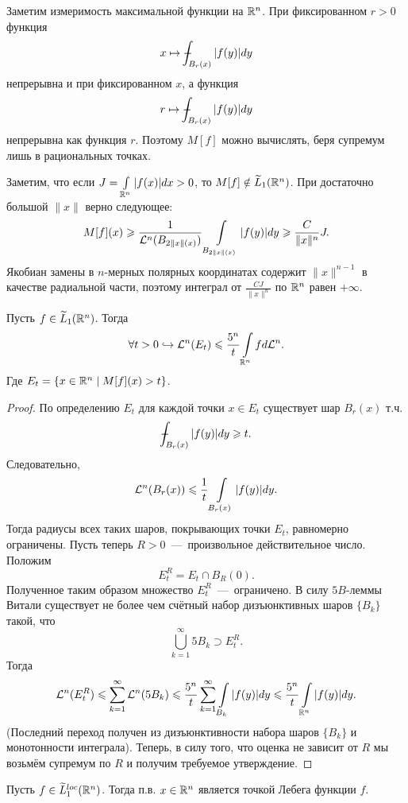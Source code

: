 \begin{note}
    Заметим измеримость максимальной функции на $\mathbb{R}^n$. При фиксированном $r > 0$ функция \[x \mapsto \dashint_{B_r(x)}|f(y)|dy\]
    непрерывна и при фиксированном $x$, а функция \[r \mapsto \dashint_{B_r(x)}|f(y)|dy\] непрерывна как функция $r$.
    Поэтому $M[f]$ можно вычислять, беря супремум лишь в рациональных точках.
\end{note}
\begin{note}
    Заметим, что если $J = \int\limits_{\mathbb{R}^n} |f(x)|dx > 0$, то $M[f] \notin \widetilde{L}_1(\mathbb{R}^n)$. При достаточно большой $\|x\|$ верно следующее: \[M[f](x) \geqslant \dfrac{1}{\mathcal{L}^n(B_{2\|x\|(x)})}\int\limits_{B_{2\|x\|(x)}}|f(y)|dy \geqslant \dfrac{C}{\|x\|^n}J.\]
    Якобиан замены в $n$-мерных полярных координатах содержит $\|x\|^{n - 1}$ в качестве радиальной части, поэтому интеграл от $\frac{CJ}{\|x\|^n}$ по $\mathbb{R}^n$ равен $+\infty$.
\end{note}
\begin{lemma}
    Пусть $f \in \widetilde{L}_1(\mathbb{R}^n)$. Тогда \[\forall t > 0 \hookrightarrow  \mathcal{L}^n(E_t) \leqslant \dfrac{5^n}{t}\int\limits_{\mathbb{R}^n}fd\mathcal{L}^n.\]
 Где $E_t = \{x \in \mathbb{R}^n \mid M[f](x) > t\}$.
\end{lemma}
\begin{proof}
    По определению $E_t$ для каждой точки $x \in E_t$ существует шар $B_r(x)$ т.ч. \[\dashint_{B_r(x)}|f(y)|dy \geq t.\]
    Следовательно, \[\mathcal{L}^n(B_r(x)) \leqslant \dfrac{1}{t}\int\limits_{B_r(x)}|f(y)|dy.\]
    Тогда радиусы всех таких шаров, покрывающих точки $E_t$, равномерно ограничены. Пусть теперь $R > 0$~---~произвольное действительное число. Положим \[E_t^R = E_t \cap B_R(0).\]
    Полученное таким образом множество $E_t^R$~---~ограничено. В силу $5B$-леммы Витали существует не более чем счётный набор дизъюнктивных шаров $\{B_k\}$ такой, что \[\bigcup\limits_{k = 1}^\infty 5B_k \supset E_t^R.\]
    Тогда \[\mathcal{L}^n(E_t^R) \leqslant \sum\limits_{k = 1}^\infty \mathcal{L}^n(5B_k) \leqslant \dfrac{5^n}{t}\sum\limits_{k = 1}^\infty \int\limits_{B_k}|f(y)|dy \leqslant \dfrac{5^n}{t}\int\limits_{\mathbb{R}^n}|f(y)|dy.\]
    (Последний переход получен из дизъюнктивности набора шаров $\{B_k\}$ и монотонности интеграла). Теперь, в силу того, что оценка не зависит от $R$ мы возьмём супремум по $R$ и получим требуемое утверждение.
\end{proof}
\begin{theorem}
    Пусть $f \in \widetilde{L}_1^{loc}(\mathbb{R}^n)$. Тогда п.в. $x \in \mathbb{R}^n$ является точкой Лебега функции $f$.
\end{theorem}
